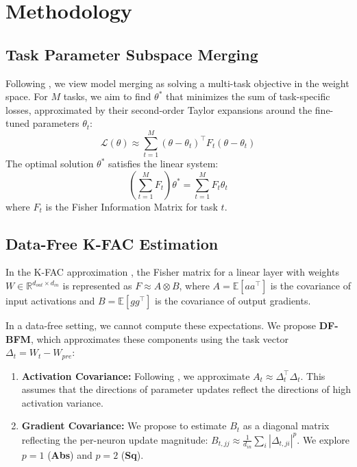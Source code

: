 \documentclass{article}
\begin{document}
\section{Methodology}

\subsection{Task Parameter Subspace Merging}
Following \citet{tam2023merging}, we view model merging as solving a multi-task objective in the weight space. For $M$ tasks, we aim to find $\theta^*$ that minimizes the sum of task-specific losses, approximated by their second-order Taylor expansions around the fine-tuned parameters $\theta_t$:
\begin{equation}
\mathcal{L}(\theta) \approx \sum_{t=1}^M (\theta - \theta_t)^\top F_t (\theta - \theta_t)
\end{equation}
The optimal solution $\theta^*$ satisfies the linear system:
\begin{equation}
\left(\sum_{t=1}^M F_t\right) \theta^* = \sum_{t=1}^M F_t \theta_t
\end{equation}
where $F_t$ is the Fisher Information Matrix for task $t$.

\subsection{Data-Free K-FAC Estimation}
In the K-FAC approximation \citep{martens2015optimizing}, the Fisher matrix for a linear layer with weights $W \in \mathbb{R}^{d_{out} \times d_{in}}$ is represented as $F \approx A \otimes B$, where $A = \mathbb{E}[aa^\top]$ is the covariance of input activations and $B = \mathbb{E}[gg^\top]$ is the covariance of output gradients. 

In a data-free setting, we cannot compute these expectations. We propose \textbf{DF-BFM}, which approximates these components using the task vector $\Delta_t = W_t - W_{pre}$:
\begin{enumerate}
    \item \textbf{Activation Covariance:} Following \citet{hameed2026actmat}, we approximate $A_t \approx \Delta_t^\top \Delta_t$. This assumes that the directions of parameter updates reflect the directions of high activation variance.
    \item \textbf{Gradient Covariance:} We propose to estimate $B_t$ as a diagonal matrix reflecting the per-neuron update magnitude: $B_{t, jj} \approx \frac{1}{d_{in}} \sum_{i} |\Delta_{t, ji}|^p$. We explore $p=1$ (\textbf{Abs}) and $p=2$ (\textbf{Sq}).
\end{enumerate}
\end{document}
